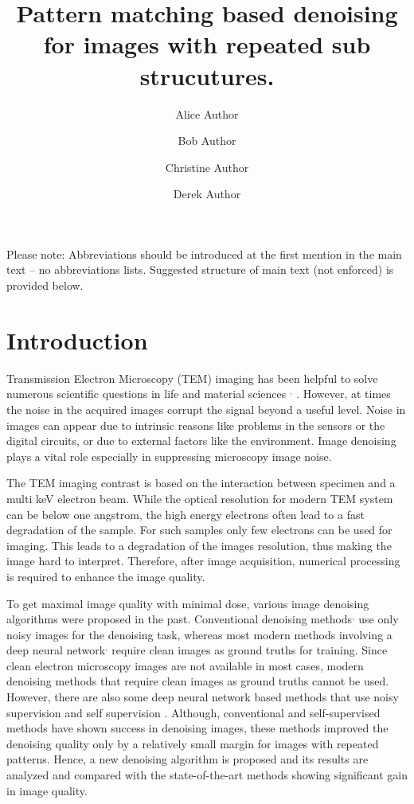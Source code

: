 \documentclass[fleqn,10pt]{wlscirep}
\title{Pattern matching based denoising for images with repeated sub strucutures.}
\author[1,*]{Alice Author}
\author[2]{Bob Author}
\author[1,2,+]{Christine Author}
\author[2,+]{Derek Author}
\affil[1]{Affiliation, department, city, postcode, country}
\affil[2]{Affiliation, department, city, postcode, country}
\affil[*]{corresponding.author@email.example}
\affil[+]{these authors contributed equally to this work}
\begin{document}
	
	\flushbottom
	\maketitle
	\thispagestyle{empty}
	
	\noindent Please note: Abbreviations should be introduced at the first mention in the main text – no abbreviations lists. Suggested structure of main text (not enforced) is provided below.
	
	\section*{Introduction}
	
	Transmission Electron Microscopy (TEM) imaging has been helpful to solve numerous scientific questions in life and material sciences \cite{CURRY200691}$^{,}$\cite{WANG2008395} . However, at times the noise in the acquired images corrupt the signal beyond a useful level. Noise in images can appear due to intrinsic reasons like problems in the sensors or the digital circuits, or due to external factors like the environment. Image denoising plays a vital role especially in suppressing microscopy image noise.
	
	The TEM imaging contrast is based on the interaction between specimen and a multi keV electron beam. While the optical resolution for modern TEM system can be below one angstrom, the high energy electrons often lead to a fast degradation of the sample. For such samples only few electrons can be used for imaging. This leads to a degradation of the images resolution, thus making the image hard to interpret. Therefore, after image acquisition, numerical processing is required to enhance the image quality.
	
	To get maximal image quality with minimal dose, various image denoising algorithms were proposed in the past. Conventional denoising methods\cite{bcm_nlm}$^{,}$ \cite{DBLP:journals/tip/BM3D} use only noisy images for the denoising task, whereas most modern methods involving a deep neural network\cite{zhang2018ffdnet}$^{,}$ \cite{zhang2017beyond} require clean images as ground truths for training. Since clean electron microscopy images are not available in most cases, modern denoising methods that require clean images as ground truths cannot be used. However, there are also some deep neural network based methods that use noisy supervision\cite{DBLP:journals/corr/abs-1803-04189} and self supervision\cite{krull2019noise2void} . Although, conventional and self-supervised methods have shown success in denoising images, these methods improved the denoising quality only by a relatively small margin for images with repeated patterns. Hence, a new denoising algorithm is proposed and its results are analyzed and compared with the state-of-the-art methods showing significant gain in image quality. 
	
\end{document}
